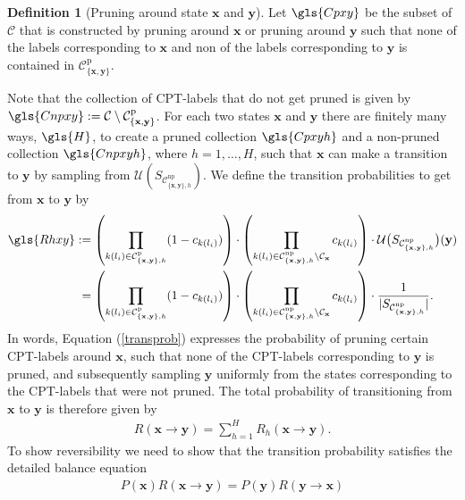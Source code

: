 \documentclass[a4paper, twoside, 11pt]{report}
\newcommand{\bfx}{{\mathbf{x}}}
\newcommand{\C}{{\mathcal C}}
\newcommand{\U}{{\mathcal{U}}}
\theoremstyle{plain}
\theoremstyle{definition}
\newtheorem{definition}[thm]{Definition}
\theoremstyle{remark}
\newcommand{\bfy}{{\mathbf{y}}}
\begin{document}
\begin{definition}[Pruning around state $\bfx$ and $\bfy$]
Let $\gls{Cpxy}$ be the subset of $\mathcal{C}$ that is constructed by pruning around $\mathbf{x}$ or pruning around $\mathbf{y}$ such that none of the labels corresponding to $\mathbf{x}$ and non of the labels corresponding to $\mathbf{y}$ is contained in $\mathcal{C}_{\{\mathbf{x}, \mathbf{y}\}}^{\text{p}}$.
\end{definition}
Note that the collection of CPT-labels that do not get pruned is given by $\gls{Cnpxy} := \C \setminus \mathcal{C}_{\{\mathbf{x}, \mathbf{y}\}}^{\text{p}}$. For each two states $\bfx$ and $\bfy$ there are finitely many ways, $\gls{H}$, to create a pruned collection $\gls{Cpxyh}$ and a non-pruned collection $\gls{Cnpxyh}$, where $h =1,\ldots, H$, such that $\bfx$ can make a transition to $\bfy$ by sampling from $\U(S_{\C_{\{\bfx, \bfy\},h}^{\text{np}}})$. We define the transition probabilities to get from $\bfx$ to $\bfy$ by
\begin{align}\label{transprob}
\gls{Rhxy} &:= \left(\prod_{k(l_i) \in \C_{\{\bfx, \bfy\},h}^{\text{p}} } (1-c_{k(l_i)}) \right) \cdot \left( \prod_{k(l_i) \in \C_{\{\bfx, \bfy\},h}^{\text{np}} \setminus \mathcal{C}_{\mathbf{x}}  } c_{k(l_i)}   \right) \cdot \mathcal{U} \big( S_{\C_{\{\bfx, \bfy\},h}^{\text{np}}} \big)(\mathbf{y}) \\ \nonumber
&\;=\left(\prod_{k(l_i) \in \C_{\{\bfx, \bfy\},h}^{\text{p}} } (1-c_{k(l_i)}) \right)\cdot \left( \prod_{k(l_i) \in \C_{\{\bfx, \bfy\},h}^{\text{np}} \setminus \mathcal{C}_{\mathbf{x}}  } c_{k(l_i)}   \right)  \nonumber \cdot \frac{1}{|S_{\C_{\{\bfx, \bfy\},h}^{\text{np}}}|}.
\end{align}
In words, Equation (\ref{transprob}) expresses the probability of pruning certain CPT-labels around $\bfx$, such that none of the CPT-labels corresponding to $\bfy$ is pruned, and subsequently sampling $\bfy$ uniformly from the states corresponding to the CPT-labels that were not pruned. The total probability of transitioning from $\bfx$ to $\bfy$ is therefore given by
\begin{align} \label{total}
{R}(\mathbf{x} \to \mathbf{y}) = \sum_{h=1}^{H} {R}_h (\mathbf{x} \to \mathbf{y}).
\end{align}
To show reversibility we need to show that the transition probability satisfies the detailed balance equation
\begin{align*}
P(\mathbf{x}) R(\mathbf{x} \to \mathbf{y}) = P(\mathbf{y}) R(\mathbf{y} \to \mathbf{x}) 
\end{align*}
\end{document}
